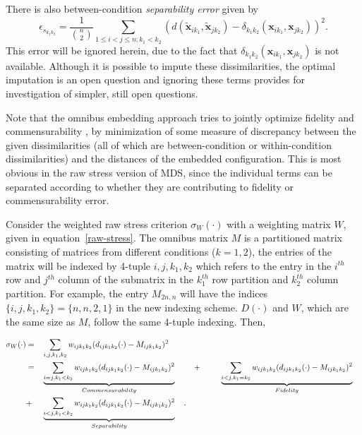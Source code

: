 \documentclass[11pt]{article} %
\begin{document}
 There is also between-condition {\em separability error} given by
    $$\epsilon_{s_{k_1k_2}} = \frac{1}{{{n}\choose{2}}} \sum_{1 \leq i < j \leq n;k_1 <k_2} (d(\widetilde{\bm{x}}_{ik_1},\widetilde{\bm{x}}_{jk_2})-{ \delta_{k_1k_2}}(\bm{x}_{ik_1},\bm{x}_{jk_2}))^2.$$ This error will be ignored herein, due to the fact that 
$\delta_{k_1k_2}(\bm{x}_{ik_1},\bm{x}_{jk_2})$ is not  available. Although it is possible to impute these dissimilarities, the optimal  imputation is an open question and ignoring these terms provides for investigation of simpler, still open questions.


Note that the omnibus embedding approach tries to jointly optimize fidelity and commensurability , by minimization of some measure of discrepancy between the given dissimilarities (all of which are between-condition or within-condition dissimilarities) and the distances of the embedded configuration. This is most obvious in the  raw stress version of  MDS, since the individual terms can be separated according to whether they are contributing to  fidelity or  commensurability  error.

 Consider the weighted raw stress criterion $\sigma_{W}(\cdot)$ with a weighting matrix $W$, given in equation~\eqref{raw-stress}.
 The omnibus matrix $M$  is a partitioned matrix consisting of matrices from different conditions ($k={1,2}$),  the entries of the matrix will be indexed by 4-tuple ${i,j,k_1,k_2}$ which refers to the entry in the $i^{th}$ row and $j^{th}$ column of the submatrix in  the $k_1^{th}$  row partition and   $k_2^{th}$ column partition. For example, the entry ${M}_{2n,n}$ will have the indices $\{i,j,k_1,k_2\}=\{n,n,2,1\}$ in the new indexing scheme. $D(\cdot)$ and $W$, which are the same size as $M$, follow the same 4-tuple indexing. Then,
 
\begin{align}
\sigma_W(\cdot)  &= & &\sum_{i,j,k_1,k_2} {w_{ij{k_1}{k_2}}(d_{ij{k_1}{k_2}}(\cdot)-M_{ijk_1k_2})^2 } \notag\\
\hspace{3pt} &=& &\underbrace{\sum_{i=j,k_1<k_2}  {w_{ij{k_1}{k_2}}(d_{ij{k_1}{k_2}}(\cdot)-M_{ijk_1k_2})^2}}_{Commensurability}  \hspace{10pt}  &  + &\hspace{2.5em} \underbrace{\sum_{i<j,k_1=k_2}  {w_{ij{k_1}{k_2}}(d_{ij{k_1}{k_2}}(\cdot)-M_{ijk_1k_2})^2  }  } _{Fidelity}\notag\\
\hspace{3pt}&+&  &\underbrace{\sum_{i< j,k_1<k_2}  {w_{ij{k_1}{k_2}}(d_{ij{k_1}{k_2}}(\cdot)-M_{ijk_1k_2})^2  }  } _{Separability}\label{eq:FidCommSep}\hspace{10pt} .
\end{align}
\end{document}
